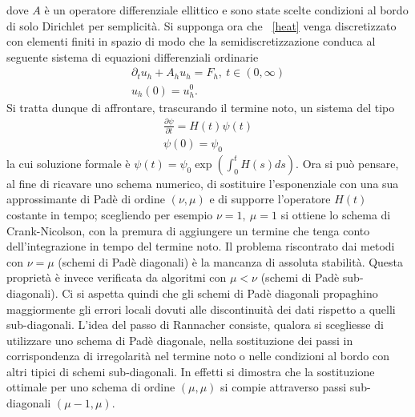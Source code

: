 dove $ A $ è un operatore differenziale ellittico e sono state scelte condizioni al bordo di solo Dirichlet per semplicità. Si supponga ora che ~\eqref{heat} venga discretizzato con elementi finiti in spazio di modo che la semidiscretizzazione conduca al seguente sistema di equazioni differenziali ordinarie
\begin{gather}
\label{heatsd}
\partial_t u_h + A_hu_h=F_h,\ t\in(0,\infty) \\
u_h(0)=u^0_h.
\end{gather}
Si tratta dunque di affrontare, trascurando il termine noto, un sistema del tipo
\begin{gather}
\label{pbmod}
\frac{\partial\psi}{\partial t}=H(t)\psi(t)  \\
\psi(0)=\psi_0
\end{gather}
la cui soluzione formale è $ \psi(t)=\psi_0\exp(\int^t_0 H(s)ds) $. Ora si può pensare, al fine di ricavare uno schema numerico, di sostituire l'esponenziale con una sua approssimante di Padè di ordine $ (\nu,\mu) $ e di supporre l'operatore $ H(t) $ costante in tempo; scegliendo per esempio $ \nu=1, \ \mu=1$ si ottiene lo schema di Crank-Nicolson, con la premura di aggiungere un termine che tenga conto dell'integrazione in tempo del termine noto. Il problema riscontrato dai metodi con $ \nu=\mu $ (schemi di Padè diagonali) è la mancanza di assoluta stabilità. Questa proprietà è invece verificata da algoritmi con $ \mu<\nu $ (schemi di Padè sub-diagonali). Ci si aspetta quindi che gli schemi di Padè diagonali propaghino maggiormente gli errori locali dovuti alle discontinuità dei dati rispetto a quelli sub-diagonali. 
L'idea del passo di Rannacher consiste, qualora si scegliesse di utilizzare uno schema di Padè diagonale, nella sostituzione dei passi in corrispondenza di irregolarità nel termine noto o nelle condizioni al bordo con altri tipici di schemi sub-diagonali. In effetti si dimostra che la sostituzione ottimale per uno schema di ordine $ (\mu,\mu) $ si compie attraverso passi sub-diagonali $ (\mu-1,\mu) $. 